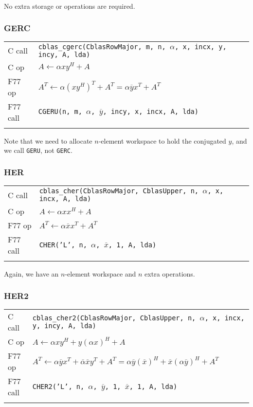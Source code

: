 \documentclass{article}
\begin{document}
No extra storage or operations are required.

\subsubsection{GERC}
{ \small
\begin{tabular}{ll}
C call   & {\tt cblas\_cgerc(CblasRowMajor, m, n, $\alpha$, x, incx, y, incy, A, lda)}\\
C op     & $A \leftarrow \alpha x y^H + A$ \\
F77 op   & $A^T \leftarrow \alpha (x y^H)^T + A^T = \alpha \overline{y} x^T + A^T$ \\
F77 call & {\tt CGERU(n, m, $\alpha$, $\overline{y}$, incy, x, incx, A, lda)}\\\\
\end{tabular}
}

Note that we need to allocate $n$-element workspace to hold
the conjugated $y$,  and we call {\tt GERU}, not {\tt GERC}.

\subsubsection{HER}
{ \small
\begin{tabular}{ll}
C call   & {\tt cblas\_cher(CblasRowMajor, CblasUpper, n, $\alpha$, x, incx, A, lda)}\\
C op     & $A \leftarrow \alpha x x^H + A$ \\
F77 op   & $A^T \leftarrow \alpha \overline{x} x^T + A^T$ \\
F77 call & {\tt CHER('L', n, $\alpha$, $\overline{x}$, 1, A, lda)}\\\\
\end{tabular}
}

Again, we have an $n$-element workspace and $n$ extra operations.

\subsubsection{HER2}
{ \small
\begin{tabular}{ll}
C call   & {\tt cblas\_cher2(CblasRowMajor, CblasUpper, n, $\alpha$, x, incx, y, incy, A, lda)}\\
C op     & $A \leftarrow \alpha x y^H + y (\alpha x)^H + A$ \\
F77 op   & $A^T \leftarrow \alpha \overline{y} x^T + \overline{\alpha} \overline{x} y^T + A^T = 
                           \alpha \overline{y} (\overline{x})^H + \overline{x} (\alpha \overline{y})^H + A^T$ \\
F77 call & {\tt CHER2('L', n, $\alpha$, $\overline{y}$, 1, $\overline{x}$, 1, A, lda)}\\\\
\end{tabular}
}
\end{document}
